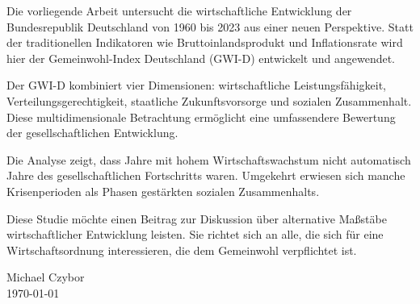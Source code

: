 Die vorliegende Arbeit untersucht die wirtschaftliche Entwicklung der Bundesrepublik Deutschland von 1960 bis 2023 aus einer neuen Perspektive.
Statt der traditionellen Indikatoren wie Bruttoinlandsprodukt und Inflationsrate wird hier der Gemeinwohl-Index Deutschland (GWI-D) entwickelt und
angewendet.

Der GWI-D kombiniert vier Dimensionen: wirtschaftliche Leistungsf{\"a}higkeit, Verteilungsgerechtigkeit, staatliche Zukunftsvorsorge und sozialen
Zusammenhalt. Diese multidimensionale Betrachtung erm{\"o}glicht eine umfassendere Bewertung der gesellschaftlichen Entwicklung.

Die Analyse zeigt, dass Jahre mit hohem Wirtschaftswachstum nicht automatisch Jahre des gesellschaftlichen Fortschritts waren. Umgekehrt erwiesen
sich manche Krisenperioden als Phasen gest{\"a}rkten sozialen Zusammenhalts.

Diese Studie m{\"o}chte einen Beitrag zur Diskussion {\"u}ber alternative Ma{\ss}st{\"a}be wirtschaftlicher Entwicklung leisten. Sie richtet sich
an alle, die sich f{\"u}r eine Wirtschaftsordnung interessieren, die dem Gemeinwohl verpflichtet ist.

\begin{flushright}
Michael Czybor \\
\today
\end{flushright}
